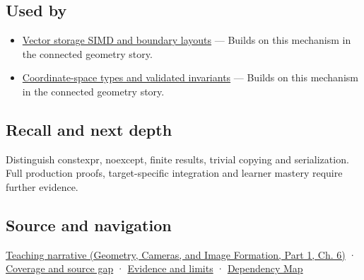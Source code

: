 \subsection{Used by}\label{appendix-37a39984ba66-used-by}

\hypertarget{appendix-37a39984ba66-used-by}{}

\begin{itemize}
\tightlist
\item
  \hyperref[appendix-26bf6bf2fb8b]{Vector storage SIMD and boundary layouts} --- Builds on this mechanism in the connected geometry story.
\item
  \hyperref[appendix-380a220e2529]{Coordinate-space types and validated invariants} --- Builds on this mechanism in the connected geometry story.
\end{itemize}

\subsection{Recall and next depth}\label{appendix-37a39984ba66-recall-and-next-depth}

\hypertarget{appendix-37a39984ba66-recall-and-next-depth}{}

Distinguish constexpr, noexcept, finite results, trivial copying and serialization. Full production proofs, target-specific integration and learner mastery require further evidence.

\subsection{Source and navigation}\label{appendix-37a39984ba66-source-and-navigation}

\hypertarget{appendix-37a39984ba66-source-and-navigation}{}

\href{../03-Geometry-Cameras-and-Image-Formation-P01/main.pdf\#02-foundations-ii-ch037-three-stored-numbers-are-not-the-complete-contract}{Teaching narrative (Geometry, Cameras, and Image Formation, Part 1, Ch. 6)} · \hyperref[appendix-fd090d982a15-phase-6---parts-501-600]{Coverage and source gap} · \hyperref[appendix-a103e7846d21-phase-6---source-analysis-and-verification]{Evidence and limits} · \hyperref[appendix-4ad47bdd269a]{Dependency Map}
